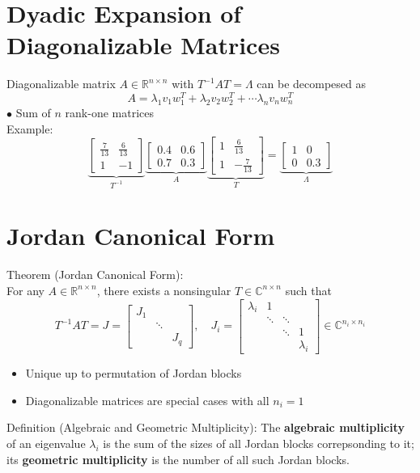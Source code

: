 \documentclass[10pt,a4paper,oneside]{article}
\begin{document}
\section{Dyadic Expansion of Diagonalizable Matrices}
Diagonalizable matrix $A \in \mathbb{R}^{n \times n}$ with $T^{-1} A T=\Lambda$ can be decompesed as
\[
A=\lambda_{1} v_{1} w_{1}^{T}+\lambda_{2} v_{2} w_{2}^{T}+\cdots \lambda_{n} v_{n} w_{n}^{T}
\]
$\bullet$ Sum of $n$ rank-one matrices\\
Example:
\[
\underbrace{\left[\begin{array}{cc}{\frac{7}{13}} & {\frac{6}{13}} \\ {1} & {-1}\end{array}\right]}_{T^{-1}} \underbrace{\left[\begin{array}{cc}{0.4} & {0.6} \\ {0.7} & {0.3}\end{array}\right]}_{A} \underbrace{\left[\begin{array}{cc}{1} & {\frac{6}{13}} \\ {1} & {-\frac{7}{13}}\end{array}\right]}_{T}=\underbrace{\left[\begin{array}{cc}{1} & {0} \\ {0} & {0.3}\end{array}\right]}_{\Lambda}
\]
\section{Jordan Canonical Form}
Theorem (Jordan Canonical Form):\\
For any $A\in\mathbb{R}^{n\times n}$, there exists a nonsingular $T\in\mathbb{C}^{n\times n}$ such that
\[
T^{-1} A T=J=\left[\begin{array}{lll}{J_{1}} & {} & {} \\ {} & {\ddots} & {} \\ {} & {} & {J_{q}}\end{array}\right], \quad J_{i}=\left[\begin{array}{cccc}{\lambda_{i}} & {1} & {} & {} \\ {} & {\ddots} & {\ddots} & {} \\ {} & {} & {\ddots} & {1} \\ {} & {} & {} & {\lambda_{i}}\end{array}\right] \in \mathbb{C}^{n_{i} \times n_{i}}
\]
\begin{itemize}
\item Unique up to permutation of Jordan blocks
\item Diagonalizable matrices are special cases with all $n_i=1$
\end{itemize}
Definition (Algebraic and Geometric Multiplicity):
The {\bfseries algebraic multiplicity} of an eigenvalue $\lambda_i$ is the sum of the sizes of all Jordan blocks correpsonding to it; its {\bfseries geometric multiplicity} is the number of all such Jordan blocks.
\end{document}
